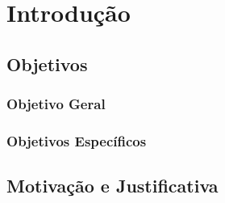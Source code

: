 \chapter{Introdução}


\section{Objetivos}

\subsection{Objetivo Geral}

\subsection{Objetivos Específicos}

\section{Motivação e Justificativa}
\label{sec:justificativa}
